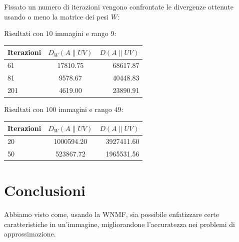 \documentclass[a4paper]{article} %
\begin{document}
Fissato un numero di iterazioni vengono confrontate le divergenze ottenute usando o meno la matrice dei pesi $W$:

\begin{center}
  Risultati con $10$ immagini e rango $9$: \\

  \begin{tabular}{| l | c | r |}
    \hline
    Iterazioni & $D_W(A\lVert UV)$ & $D(A\lVert UV)$ \\
    \hline
    61 & 17810.75 & 68617.87 \\
    81 &  9578.67 & 40448.83 \\
    201 & 4619.00 & 23890.91 \\
    \hline
  \end{tabular}
  \vspace{0.5cm}

  Risultati con $100$ immagini e rango $49$: \\

  \begin{tabular}{| l | c | r |}
    \hline
    Iterazioni & $D_W(A\lVert UV)$ & $D(A\lVert UV)$ \\
    \hline
    20 & 1000594.20 & 3927411.60 \\
    50 &  523867.72 & 1965531.56 \\
    \hline
  \end{tabular}

\end{center}

\section{Conclusioni}
Abbiamo visto come, usando la WNMF, sia possibile enfatizzare certe caratteristiche in un'immagine, migliorandone l'accuratezza nei problemi di approssimazione.
\end{document}
